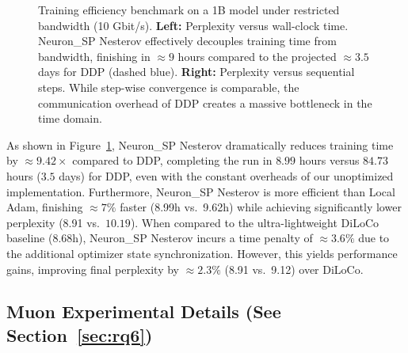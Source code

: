 \documentclass{article}
\begin{document}
\begin{figure}[t]
\centering
\caption{Training efficiency benchmark on a 1B model under restricted bandwidth (10 Gbit/s). \textbf{Left:} Perplexity versus wall-clock time. Neuron\_SP Nesterov effectively decouples training time from bandwidth, finishing in $\approx 9$ hours compared to the projected $\approx 3.5$ days for DDP (dashed blue). \textbf{Right:} Perplexity versus sequential steps. While step-wise convergence is comparable, the communication overhead of DDP creates a massive bottleneck in the time domain.}
\label{fig:low_bandwidth}
\end{figure}

As shown in Figure~\ref{fig:low_bandwidth}, Neuron\_SP Nesterov dramatically reduces training time by $\approx 9.42\times$ compared to DDP, completing the run in $8.99$ hours versus $84.73$ hours ($3.5$ days) for DDP, even with the constant overheads of our unoptimized implementation. Furthermore, Neuron\_SP Nesterov is more efficient than Local Adam, finishing $\approx 7\%$ faster (8.99h vs.\ 9.62h) while achieving significantly lower perplexity (8.91 vs.\ $10.19$). When compared to the ultra-lightweight DiLoCo baseline (8.68h), Neuron\_SP Nesterov incurs a time penalty of $\approx 3.6\%$ due to the additional optimizer state synchronization. However, this yields performance gains, improving final perplexity by $\approx 2.3\%$ (8.91 vs.\ 9.12) over DiLoCo.

\begin{center}\end{center}

\subsection{Muon Experimental Details (See Section~\ref{sec:rq6})}
\label{sec:b7_muon_details}
\end{document}
